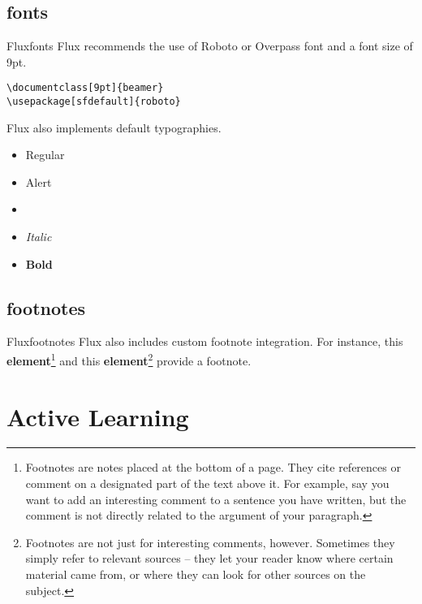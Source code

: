 \documentclass[9pt]{beamer}
\begin{document}
		\subsection{fonts}
		
		\begin{frame}[fragile]{Flux}{fonts}
			Flux recommends the use of Roboto or Overpass font and a font size of 9pt.\\[0.2cm]
			\begin{center}
				\verb+\documentclass[9pt]{beamer}+\\
				\verb+\usepackage[sfdefault]{roboto}+
			\end{center}
			
			Flux also implements default typographies.
			
			\begin{itemize}
				\item Regular
				\item \alert{Alert}
				\item {}
				\item \textit{Italic}
				\item \textbf{Bold}
			\end{itemize}
			
		\end{frame}
		
		\subsection{footnotes}
		
		\begin{frame}{Flux}{footnotes}
			Flux also includes custom footnote integration. For instance, this \textbf{element}\footnote{Footnotes are notes placed at the bottom of a page. They cite references or comment on a designated part of the text above it. For example, say you want to add an interesting comment to a sentence you have written, but the comment is not directly related to the argument of your paragraph. } and this \textbf{element}\footnote{Footnotes are not just for interesting comments, however. Sometimes they simply refer to relevant sources -- they let your reader know where certain material came from, or where they can look for other sources on the subject.} provide a footnote.
		\end{frame}
		
		\section{Active Learning}
\end{document}
